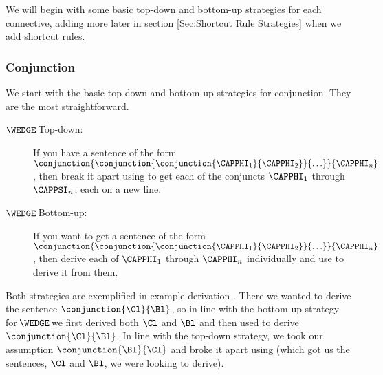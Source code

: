 We will begin with some basic top-down and bottom-up strategies for each connective, adding more later in section \ref{Sec:Shortcut Rule Strategies} when we add shortcut rules.

\subsubsection*{Conjunction} 
We start with the basic top-down and bottom-up strategies for conjunction. They are the most straightforward.
\begin{description}
\item[$\WEDGE\!$ Top-down:] If you have a sentence of the form $\conjunction{\conjunction{\conjunction{\CAPPHI_1}{\CAPPHI_2}}{\ldots}}{\CAPPHI_n}$, then break it apart using  to get each of the conjuncts $\CAPPHI_1$ through $\CAPPSI_n$, each on a new line.
\item[$\WEDGE\!$ Bottom-up:] If you want to get a sentence of the form $\conjunction{\conjunction{\conjunction{\CAPPHI_1}{\CAPPHI_2}}{\ldots}}{\CAPPHI_n}$, then derive each of $\CAPPHI_1$ through $\CAPPHI_n$ individually and use  to derive it from them. 
\end{description} 
Both strategies are exemplified in example derivation . 
There we wanted to derive the sentence $\conjunction{\Cl}{\Bl}$, so in line with the bottom-up strategy for $\!\WEDGE\!$ we first derived both $\Cl$ and $\Bl$ and then used  to derive $\conjunction{\Cl}{\Bl}$. 
In line with the top-down strategy, we took our assumption $\conjunction{\Bl}{\Cl}$ and broke it apart using  (which got us the sentences, $\Cl$ and $\Bl$, we were looking to derive). 

